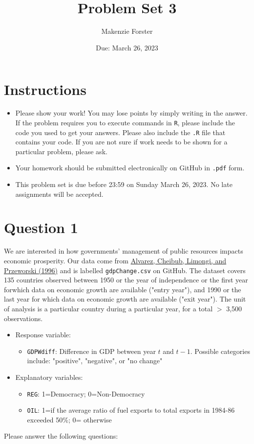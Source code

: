 \documentclass[12pt,letterpaper]{article}
\title{Problem Set 3}
\date{Due: March 26, 2023}
\author{Makenzie Forster}
\begin{document}
	\maketitle
	\section*{Instructions}
	\begin{itemize}
	\item Please show your work! You may lose points by simply writing in the answer. If the problem requires you to execute commands in \texttt{R}, please include the code you used to get your answers. Please also include the \texttt{.R} file that contains your code. If you are not sure if work needs to be shown for a particular problem, please ask.
\item Your homework should be submitted electronically on GitHub in \texttt{.pdf} form.
\item This problem set is due before 23:59 on Sunday March 26, 2023. No late assignments will be accepted.
	\end{itemize}

	\vspace{.25cm}
\section*{Question 1}
\vspace{.25cm}
\noindent We are interested in how governments' management of public resources impacts economic prosperity. Our data come from \href{https://www.researchgate.net/profile/Adam_Przeworski/publication/240357392_Classifying_Political_Regimes/links/0deec532194849aefa000000/Classifying-Political-Regimes.pdf}{Alvarez, Cheibub, Limongi, and Przeworski (1996)} and is labelled \texttt{gdpChange.csv} on GitHub. The dataset covers 135 countries observed between 1950 or the year of independence or the first year forwhich data on economic growth are available ("entry year"), and 1990 or the last year for which data on economic growth are available ("exit year"). The unit of analysis is a particular country during a particular year, for a total $>$ 3,500 observations. 

\begin{itemize}
	\item
	Response variable: 
	\begin{itemize}
		\item \texttt{GDPWdiff}: Difference in GDP between year $t$ and $t-1$. Possible categories include: "positive", "negative", or "no change"
	\end{itemize}

	\item
	Explanatory variables: 
	\begin{itemize}
		\item
		\texttt{REG}: 1=Democracy; 0=Non-Democracy
		\item
		\texttt{OIL}: 1=if the average ratio of fuel exports to total exports in 1984-86 exceeded 50\%; 0= otherwise
	\end{itemize}
	
\end{itemize}
\newpage
\noindent Please answer the following questions:
\end{document}
